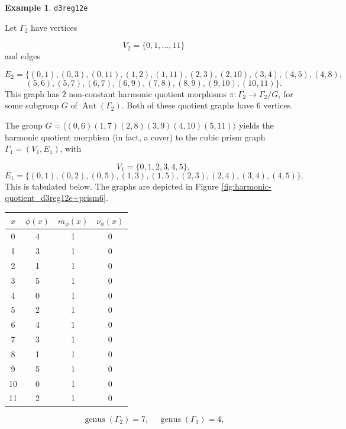 \documentclass[12pt,letterpaper]{article}
\theoremstyle{definition}
\newtheorem{example}[theorem]{Example}
\DeclareMathOperator{\Aut}{Aut}
\DeclareMathOperator{\genus}{genus}
\begin{document}
\begin{example}%
\label{example:d3reg12e}
  {\tt d3reg12e}\newline
{\rm  
Let $\Gamma_2$ have vertices

\[
V_2=\{0,1,\dots,11\}
\]
and edges

\[
E_2 = \{
(0, 1), (0, 3), (0, 11), (1, 2), (1, 11), (2, 3), (2, 10), (3, 4), (4, 5), (4, 8),
\]
\[
(5, 6), (5, 7), (6, 7), (6, 9), (7, 8), (8, 9), (9, 10), (10, 11)
\}.
\]
This graph has $2$ non-constant harmonic quotient
morphisms $\pi: \Gamma_2\to \Gamma_2/G$, for some subgroup
$G$ of $\Aut(\Gamma_2)$. Both of these quotient graphs have $6$ vertices.

The group
$G = \langle (0,6)(1,7)(2,8)(3,9)(4,10)(5,11) \rangle$ yields the
harmonic quotient morphism (in fact, a cover) to the cubic prism graph
$\Gamma_1 = (V_1,E_1)$, with

\[
V_1=\{0, 1, 2, 3, 4, 5\},
\]
\[
E_1=\{
(0, 1), (0, 2), (0, 5), (1, 3), (1, 5), (2, 3), (2, 4), (3, 4), (4, 5)
\}.
\]
This is tabulated below. The graphs are depicted in
Figure \ref{fig:harmonic-quotient_d3reg12e+prism6}.

\begin{center}
\begin{tabular}{c|c|c|c}  
  $x$ & $\phi(x)$ & $m_\phi(x)$ & $\nu_\phi(x)$ \\ \hline
  0   &    4   &        1         &  0   \\ 
  1   &    3   &        1         &  0   \\ 
  2   &    1   &        1         &  0   \\ 
  3   &    5   &        1         &  0   \\ 
  4   &    0   &        1         &  0   \\ 
  5   &    2   &        1         &  0    \\ 
  6   &    4   &        1         &  0   \\ 
  7   &    3   &        1         &  0   \\
  8   &    1   &        1         &  0   \\
  9   &    5   &        1         &  0   \\
  10   &   0   &        1         &  0   \\
  11  &    2   &        1         &  0   \\ 
\end{tabular}
\end{center}

\[
  \genus(\Gamma_2) =7,\ \ \ \ \
  \genus(\Gamma_1) =4,
\]

}
\end{example}
\end{document}
